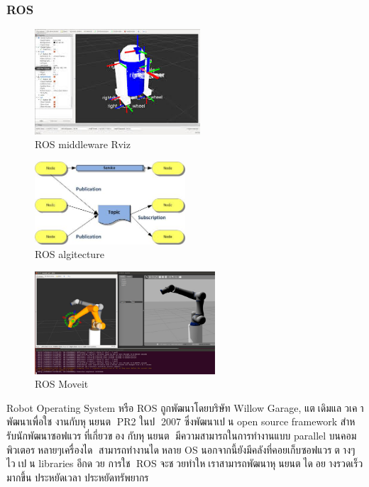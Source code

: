 \subsubsection*{ROS}
\begin{figure}[htbp]
    \centering
    \includegraphics[width=0.55\textwidth]{chapter2/images/mdw_ros.jpeg}
    \caption{ROS middleware Rviz}
    \label{fig:mdw_ros}
\end{figure}
\begin{figure}[htbp]
    \centering
    \includegraphics[width=0.5\textwidth]{chapter2/images/mdw_ros2.jpeg}
    \caption{ROS algitecture}
    \label{fig:mdw_ros2}
\end{figure}
\begin{figure}[htbp]
    \centering
    \includegraphics[width=0.6\textwidth]{chapter2/images/mdw_ros3.jpeg}
    \caption{ROS Moveit}
    \label{fig:mdw_ros3}
\end{figure}
Robot Operating System หรือ ROS ถูกพัฒนาโดยบริษัท Willow Garage, แตเดิมแลวเคาพัฒนาเพื่อใช
งานกับหุนยนต PR2 ในป 2007 ซึ่งพัฒนาเปน open source framework สําหรับนักพัฒนาซอฟแวรที่เกี่ยวของ
กับหุนยนต มีความสามารถในการทํางานแบบ parallel บนคอมพิวเตอรหลายๆเครื่องได สามารถทํางานไดหลาย
OS นอกจากนี้ยังมีคลังที่คอยเก็บซอฟแวรตางๆไวเปน libraries อีกดวย การใช ROS
จะชวยทําใหเราสามารถพัฒนาหุนยนตไดอยางรวดเร็วมากขึ้น ประหยัดเวลา ประหยัดทรัพยากร

